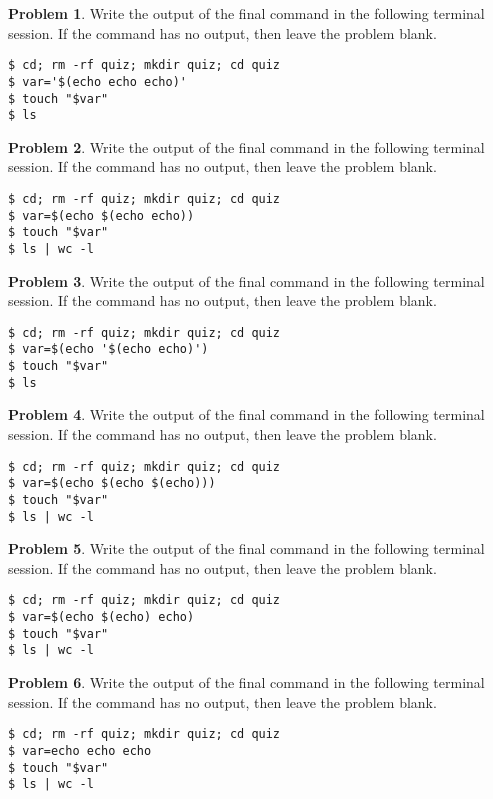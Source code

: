 \documentclass[10pt]{article}
\theoremstyle{definition}
\newtheorem{problem}{Problem}
\begin{document}
\filbreak\begin{problem}
    Write the output of the final command in the following terminal session.
    If the command has no output, then leave the problem blank.
\end{problem}
\begin{lstlisting}
$ cd; rm -rf quiz; mkdir quiz; cd quiz
$ var='$(echo echo echo)'
$ touch "$var"
$ ls
\end{lstlisting}
\vspace{0.4in}

\filbreak\begin{problem}
    Write the output of the final command in the following terminal session.
    If the command has no output, then leave the problem blank.
\end{problem}
\begin{lstlisting}
$ cd; rm -rf quiz; mkdir quiz; cd quiz
$ var=$(echo $(echo echo))
$ touch "$var"
$ ls | wc -l
\end{lstlisting}
\vspace{0.4in}


\filbreak\begin{problem}
    Write the output of the final command in the following terminal session.
    If the command has no output, then leave the problem blank.
\end{problem}
\begin{lstlisting}
$ cd; rm -rf quiz; mkdir quiz; cd quiz
$ var=$(echo '$(echo echo)')
$ touch "$var"
$ ls
\end{lstlisting}
\vspace{0.4in}

\filbreak\begin{problem}
    Write the output of the final command in the following terminal session.
    If the command has no output, then leave the problem blank.
\end{problem}
\begin{lstlisting}
$ cd; rm -rf quiz; mkdir quiz; cd quiz
$ var=$(echo $(echo $(echo)))
$ touch "$var"
$ ls | wc -l
\end{lstlisting}
\vspace{0.4in}


\filbreak\begin{problem}
    Write the output of the final command in the following terminal session.
    If the command has no output, then leave the problem blank.
\end{problem}
\begin{lstlisting}
$ cd; rm -rf quiz; mkdir quiz; cd quiz
$ var=$(echo $(echo) echo)
$ touch "$var"
$ ls | wc -l
\end{lstlisting}
\vspace{0.4in}
\filbreak\begin{problem}
    Write the output of the final command in the following terminal session.
    If the command has no output, then leave the problem blank.
\end{problem}
\begin{lstlisting}
$ cd; rm -rf quiz; mkdir quiz; cd quiz
$ var=echo echo echo
$ touch "$var"
$ ls | wc -l
\end{lstlisting}
\vspace{0.4in}
\end{document}
